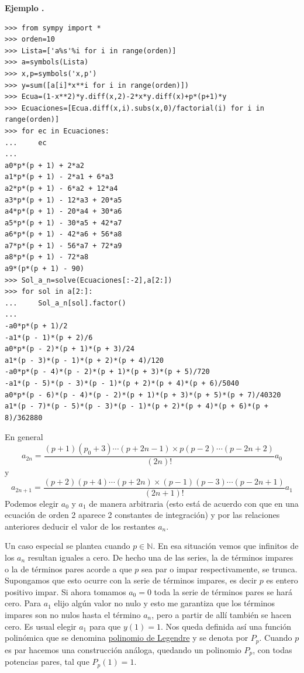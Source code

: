 \documentclass{article}
\newcounter{defi_cont}
\newcounter{cor_cont}
\newcounter{ejem_cont}
\newenvironment{ejemplo}[1]{\refstepcounter{ejem_cont}\vspace{1ex}\noindent\textbf{Ejemplo \arabic{ejem_cont}.} #1}{}
\begin{document}
\begin{ejemplo}
\begin{lstlisting}
>>> from sympy import *
>>> orden=10
>>> Lista=['a%s'%i for i in range(orden)]
>>> a=symbols(Lista)
>>> x,p=symbols('x,p')
>>> y=sum([a[i]*x**i for i in range(orden)])
>>> Ecua=(1-x**2)*y.diff(x,2)-2*x*y.diff(x)+p*(p+1)*y
>>> Ecuaciones=[Ecua.diff(x,i).subs(x,0)/factorial(i) for i in range(orden)]
>>> for ec in Ecuaciones:
...     ec
... 
a0*p*(p + 1) + 2*a2
a1*p*(p + 1) - 2*a1 + 6*a3
a2*p*(p + 1) - 6*a2 + 12*a4
a3*p*(p + 1) - 12*a3 + 20*a5
a4*p*(p + 1) - 20*a4 + 30*a6
a5*p*(p + 1) - 30*a5 + 42*a7
a6*p*(p + 1) - 42*a6 + 56*a8
a7*p*(p + 1) - 56*a7 + 72*a9
a8*p*(p + 1) - 72*a8
a9*(p*(p + 1) - 90)
>>> Sol_a_n=solve(Ecuaciones[:-2],a[2:])
>>> for sol in a[2:]:
...     Sol_a_n[sol].factor()
... 
-a0*p*(p + 1)/2
-a1*(p - 1)*(p + 2)/6
a0*p*(p - 2)*(p + 1)*(p + 3)/24
a1*(p - 3)*(p - 1)*(p + 2)*(p + 4)/120
-a0*p*(p - 4)*(p - 2)*(p + 1)*(p + 3)*(p + 5)/720
-a1*(p - 5)*(p - 3)*(p - 1)*(p + 2)*(p + 4)*(p + 6)/5040
a0*p*(p - 6)*(p - 4)*(p - 2)*(p + 1)*(p + 3)*(p + 5)*(p + 7)/40320
a1*(p - 7)*(p - 5)*(p - 3)*(p - 1)*(p + 2)*(p + 4)*(p + 6)*(p + 8)/362880

\end{lstlisting}





En general 
\[a_{2n}=\frac{(p+1)(p_0+3)\cdots (p+2n-1) \times p(p-2)\cdots (p-2n+2)}{(2n)!}a_0\]
y
\[a_{2n+1}=\frac{(p+2)(p+4)\cdots (p+2n) \times (p-1)(p-3)\cdots (p-2n+1)}{(2n+1)!}a_1\]
Podemos elegir $a_0$ y $a_1$ de manera arbitraria (esto está de acuerdo con que en una ecuación de orden 2 aparece 2 constantes de integración) y por las relaciones anteriores deducir el valor de los restantes $a_n$.

Un caso especial se plantea cuando  $p\in\mathbb{N}$. En esa situación vemos que infinitos de los $a_n$ resultan iguales a cero. De hecho una de las series, la de términos impares o la de términos pares acorde a que $p$ sea par o impar respectivamente,  se trunca. Supongamos que esto ocurre con la serie de términos impares, es decir $p$ es entero positivo impar. Si ahora tomamos $a_0=0$ toda la serie de términos pares se hará cero. Para $a_1$ elijo algún valor no nulo y esto me garantiza que los términos impares son no nulos hasta el término $a_{n}$, pero a partir de allí también se hacen cero. Es usual elegir $a_1$ para que $y(1)=1$. Nos queda definida así una función polinómica que se denomina \href{http://es.wikipedia.org/wiki/Polinomios_de_Legendre}{polinomio de Legendre} y se denota por $P_p$. Cuando $p$ es par hacemos una construcción análoga, quedando un polinomio $P_p$, con todas potencias pares, tal que $P_p(1)=1$.


\end{ejemplo}
\end{document}
